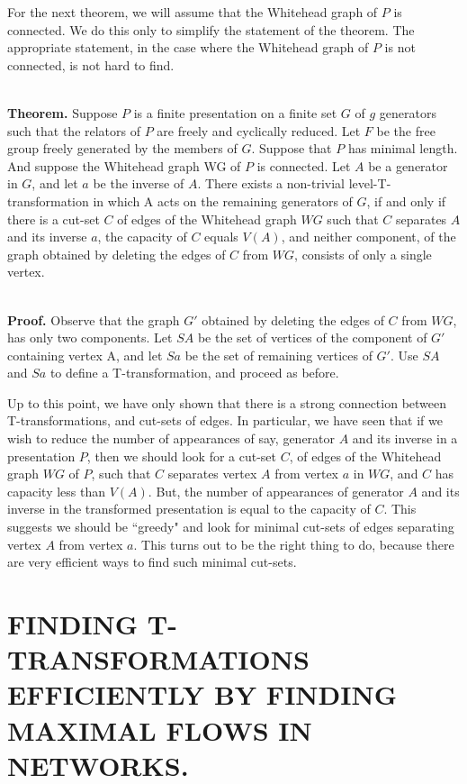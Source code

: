 \documentclass[12pt]{amsart}
\newcommand{\theorem}{\ \\ \noindent  \textbf{Theorem.} }
\newcommand{\pf}{\ \\ \noindent \textbf{Proof.} }
\begin{document}
                For the next theorem, we will assume that the Whitehead graph of $P$ is connected.
        We do this only to simplify the statement of the theorem. The appropriate statement, in
        the case where the Whitehead graph of $P$ is not connected, is not hard to find.
                
\theorem  Suppose $P$ is a finite presentation on a finite set $G$ of $g$ generators such that the
        relators of $P$ are freely and cyclically reduced. Let $F$ be the free group freely generated
        by the members of $G$. Suppose that $P$ has minimal length. And suppose the Whitehead graph
        WG of $P$ is connected. Let $A$ be a generator in $G$, and let $a$ be the inverse of $A$. There
        exists a non-trivial level-T-transformation in which A acts on the remaining generators
        of $G$, if and only if there is a cut-set $C$ of edges of the Whitehead graph $WG$ such that $C$
        separates $A$ and its inverse $a$, the capacity of $C$ equals $V(A)$, and neither component, of
        the graph obtained by deleting the edges of $C$ from $WG$, consists of only a single vertex.
                
\pf  Observe that the graph $G'$ obtained by deleting the edges of $C$ from $WG$, has only two
        components. Let $SA$ be the set of vertices of the component of $G'$ containing vertex A, and
        let $Sa$ be the set of remaining vertices of $G'$. Use $SA$ and $Sa$ to define a T-transformation,
        and proceed as before.          
        
        Up to this point, we have only shown that there is a strong
        connection between T-transformations, and cut-sets of edges.
        In particular, we have seen that if we wish to reduce the
        number of appearances of say, generator $A$ and its inverse in a
        presentation $P$, then we should look for a cut-set $C$, of
        edges of the Whitehead graph $WG$ of $P$, such that $C$
        separates vertex $A$ from vertex $a$ in $WG$, and $C$ has capacity
        less than $V(A)$. But, the number of appearances of generator $A$
        and its inverse in the transformed presentation is equal to
        the capacity of $C$. This suggests we should be ``greedy" and
        look for minimal cut-sets of edges separating vertex $A$ from
        vertex $a$. This turns out to be the right thing to do, because
        there are very efficient ways to find such minimal cut-sets.
        
        \section{FINDING T-TRANSFORMATIONS EFFICIENTLY BY FINDING MAXIMAL FLOWS IN NETWORKS.}
\end{document}
